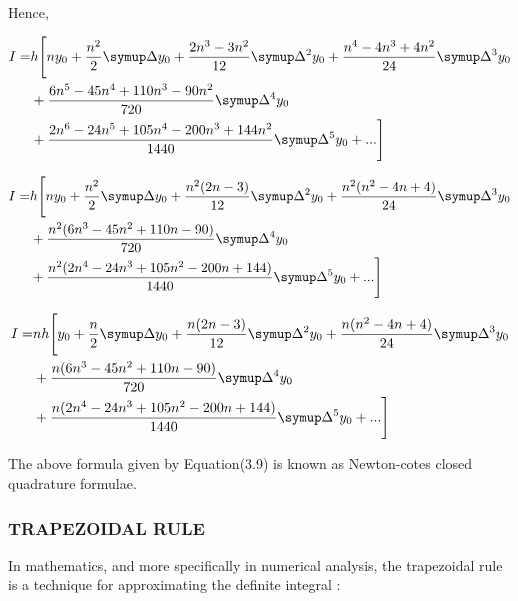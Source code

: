 \documentclass[a4paper,12pt]{report}
\numberwithin{equation}{section}
\begin{document}
\\Hence,

\begin{equation}
\begin{split}
I=&h\Bigg[ny_0+\frac{n^2}{2}\symup\Delta{y_0}+\frac{2n^3-3n^2}{12}\symup\Delta^2y_0+\frac{n^4-4n^3+4n^2}{24}\symup\Delta^3y_0\\ 
&+\frac{6n^5-45n^4+110n^3-90n^2}{720}\symup\Delta^4y_0\\
&+\frac{2n^6-24n^5+105n^4-200n^3+144n^2}{1440}\symup\Delta^5y_0+...\Bigg]
\end{split}
\end{equation}

\begin{equation}
\begin{split}
I=&h\Bigg[ny_0+\frac{n^2}{2}\symup\Delta{y_0}+\frac{n^2(2n-3)}{12}\symup\Delta^2y_0+\frac{n^2(n^2-4n+4)}{24}\symup\Delta^3y_0\\ 
&+\frac{n^2(6n^3-45n^2+110n-90)}{720}\symup\Delta^4y_0\\
&+\frac{n^2(2n^4-24n^3+105n^2-200n+144)}{1440}\symup\Delta^5y_0+...\Bigg]
\end{split}
\end{equation}

\begin{equation}
\begin{split}
I=&nh\Bigg[y_0+\frac{n}{2}\symup\Delta{y_0}+\frac{n(2n-3)}{12}\symup\Delta^2y_0+\frac{n(n^2-4n+4)}{24}\symup\Delta^3y_0\\ 
&+\frac{n(6n^3-45n^2+110n-90)}{720}\symup\Delta^4y_0\\
&+\frac{n(2n^4-24n^3+105n^2-200n+144)}{1440}\symup\Delta^5y_0+...\Bigg]
\end{split}
\end{equation}

The above formula given by Equation(3.9) is known as Newton-cotes closed quadrature formulae.







\subsubsection{TRAPEZOIDAL RULE}
In mathematics, and more specifically in numerical analysis, the trapezoidal rule is a technique for approximating the definite integral :
\end{document}
